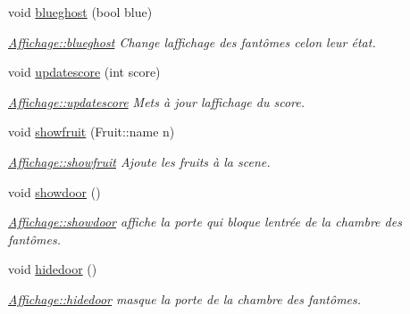 \begin{DoxyCompactItemize}
\item 
void \hyperlink{class_affichage_a20b54533da80487931d2a0740f71a93c}{blueghost} (bool blue)
\begin{DoxyCompactList}\small\item\em \hyperlink{class_affichage_a20b54533da80487931d2a0740f71a93c}{Affichage\+::blueghost} Change l\textquotesingle{}affichage des fantômes celon leur état. \end{DoxyCompactList}\item 
void \hyperlink{class_affichage_afdc79f3124d32c3d7f6e794a7c671387}{updatescore} (int score)
\begin{DoxyCompactList}\small\item\em \hyperlink{class_affichage_afdc79f3124d32c3d7f6e794a7c671387}{Affichage\+::updatescore} Mets à jour l\textquotesingle{}affichage du score. \end{DoxyCompactList}\item 
void \hyperlink{class_affichage_a9459e58d9be0e3feb14bcc777525869a}{showfruit} (Fruit\+::name n)
\begin{DoxyCompactList}\small\item\em \hyperlink{class_affichage_a9459e58d9be0e3feb14bcc777525869a}{Affichage\+::showfruit} Ajoute les fruits à la scene. \end{DoxyCompactList}\item 
\hypertarget{class_affichage_a6750f75dca1853a3089bd352ed33f133}{}void \hyperlink{class_affichage_a6750f75dca1853a3089bd352ed33f133}{showdoor} ()\label{class_affichage_a6750f75dca1853a3089bd352ed33f133}

\begin{DoxyCompactList}\small\item\em \hyperlink{class_affichage_a6750f75dca1853a3089bd352ed33f133}{Affichage\+::showdoor} affiche la porte qui bloque l\textquotesingle{}entrée de la chambre des fantômes. \end{DoxyCompactList}\item 
\hypertarget{class_affichage_ae9abd0b592495b78d2e97b570b7e2e82}{}void \hyperlink{class_affichage_ae9abd0b592495b78d2e97b570b7e2e82}{hidedoor} ()\label{class_affichage_ae9abd0b592495b78d2e97b570b7e2e82}

\begin{DoxyCompactList}\small\item\em \hyperlink{class_affichage_ae9abd0b592495b78d2e97b570b7e2e82}{Affichage\+::hidedoor} masque la porte de la chambre des fantômes. \end{DoxyCompactList}\end{DoxyCompactItemize}


